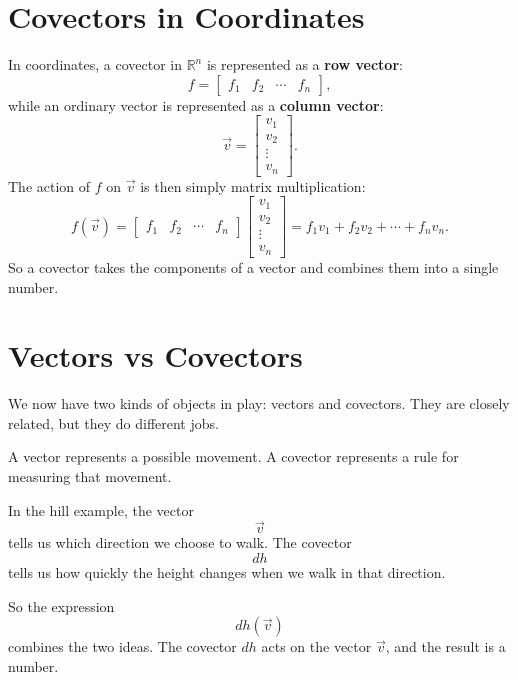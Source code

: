 \documentclass[11pt,openany]{book}
\theoremstyle{definition}
\begin{document}
\medskip \section{Covectors in Coordinates} In coordinates, a covector in $\mathbb{R}^n$ is represented as a \textbf{row vector}: \[ f = \begin{bmatrix} f_1 & f_2 & \cdots & f_n \end{bmatrix}, \] while an ordinary vector is represented as a \textbf{column vector}: \[ \vec{v} = \begin{bmatrix} v_1 \\ v_2 \\ \vdots \\ v_n \end{bmatrix}. \] \medskip The action of $f$ on $\vec{v}$ is then simply matrix multiplication: \[ f(\vec{v}) = \begin{bmatrix} f_1 & f_2 & \cdots & f_n \end{bmatrix} \begin{bmatrix} v_1 \\ v_2 \\ \vdots \\ v_n \end{bmatrix} = f_1 v_1 + f_2 v_2 + \cdots + f_n v_n. \] \medskip So a covector takes the components of a vector and combines them into a single number.

\section{Vectors vs Covectors}

We now have two kinds of objects in play: vectors and covectors. They are closely
related, but they do different jobs.

A vector represents a possible movement. A covector represents a rule for
measuring that movement.

\medskip

In the hill example, the vector
\[
\vec{v}
\]
tells us which direction we choose to walk. The covector
\[
dh
\]
tells us how quickly the height changes when we walk in that direction.

\medskip

So the expression
\[
dh(\vec{v})
\]
combines the two ideas. The covector \(dh\) acts on the vector \(\vec{v}\), and
the result is a number.
\end{document}
